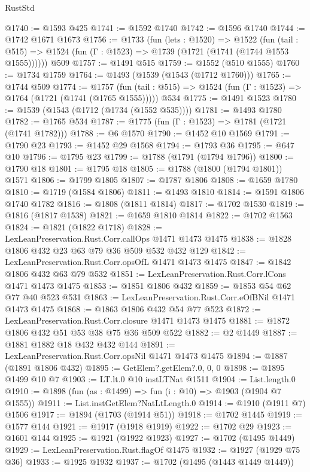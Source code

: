 \begin{lexlean}{RustStd}
\begin{coremodule}
@1740 := @1593 @425
@1741 := @1592 @1740
@1742 := @1596 @1740
@1744 := @1742 @1671 @1673
@1756 := @1733
    (fun (lets : @1520) =>
    @1522
      (fun (tail : @515) => @1524 (fun (Γ : @1523) => @1739 (@1721 (@1741 (@1744 @1553 @1555))))))
    @509
@1757 := @1491 @515
@1759 := @1552 (@510 @1555)
@1760 := @1734 @1759
@1764 := @1493 (@1539 (@1543 (@1712 @1760)))
@1765 := @1744 @509
@1774 := @1757
    (fun (tail : @515) => @1524 (fun (Γ : @1523) => @1764 (@1721 (@1741 (@1765 @1555)))))
    @534
@1775 := @1491 @1523
@1780 := @1539 (@1543 (@1712 (@1734 (@1552 @535))))
@1781 := @1493 @1780
@1782 := @1765 @534
@1787 := @1775 (fun (Γ : @1523) => @1781 (@1721 (@1741 @1782)))
@1788 := @6 @1570
@1790 := @1452 @10 @1569
@1791 := @1790 @23
@1793 := @1452 @29 @1568
@1794 := @1793 @36
@1795 := @647 @10
@1796 := @1795 @23
@1799 := @1788 (@1791 (@1794 @1796))
@1800 := @1790 @18
@1801 := @1795 @18
@1805 := @1788 (@1800 (@1794 @1801)) @1571
@1806 := @1799 @1805
@1807 := @1787 @1806
@1808 := @1659 @1780
@1810 := @1719 (@1584 @1806)
@1811 := @1493 @1810
@1814 := @1591 @1806 @1740 @1782
@1816 := @1808 (@1811 @1814)
@1817 := @1702 @1530
@1819 := @1816 (@1817 @1538)
@1821 := @1659 @1810 @1814
@1822 := @1702 @1563
@1824 := @1821 (@1822 @1718)
@1828 := LexLeanPreservation.Rust.Corr.callOps @1471 @1473 @1475
@1838 := @1828 @1806 @432 @23 @63 @79 @36 @509 @532 @432 @129
@1842 := LexLeanPreservation.Rust.Corr.opsOfL @1471 @1473 @1475
@1847 := @1842 @1806 @432 @63 @79 @532
@1851 := LexLeanPreservation.Rust.Corr.lCons @1471 @1473 @1475
@1853 := @1851 @1806 @432
@1859 := @1853 @54 @62 @77 @40 @523 @531
@1863 := LexLeanPreservation.Rust.Corr.eOfBNil @1471 @1473 @1475
@1868 := @1863 @1806 @432 @54 @77 @523
@1872 := LexLeanPreservation.Rust.Corr.closure @1471 @1473 @1475
@1881 := @1872 @1806 @432 @51 @53 @38 @75 @36 @509 @522
@1882 := @2 @1449
@1887 := @1881 @1882 @18 @432 @432 @144
@1891 := LexLeanPreservation.Rust.Corr.opsNil @1471 @1473 @1475
@1894 := @1887 (@1891 @1806 @432)
@1895 := GetElem?.getElem?.{0, 0, 0}
@1898 := @1895 @1499 @10 @7
@1903 := LT.lt.{0} @10 instLTNat @1511
@1904 := List.length.{0}
@1910 := @1898 (fun (as : @1499) => fun (i : @10) => @1903 (@1904 @7 @1555))
@1911 := List.instGetElem?NatLtLength.{0}
@1914 := @1910 (@1911 @7) @1506
@1917 := @1894 (@1703 (@1914 @51))
@1918 := @1702 @1445
@1919 := @1577 @144
@1921 := @1917 (@1918 @1919)
@1922 := @1702 @29
@1923 := @1601 @144
@1925 := @1921 (@1922 @1923)
@1927 := @1702 (@1495 @1449)
@1929 := LexLeanPreservation.Rust.flagOf @1475
@1932 := @1927 (@1929 @75 @36)
@1933 := @1925 @1932
@1937 := @1702 (@1495 (@1443 @1449 @1449))

\end{coremodule}
\end{lexlean}
